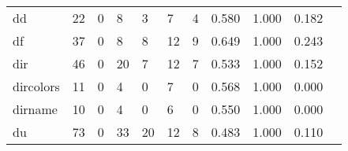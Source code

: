 \begin{longtable}{lp{1.20cm}p{1.20cm}p{1.20cm}p{1.20cm}p{1.20cm}p{1.20cm}p{1.20cm}p{1.20cm}p{1.20cm}p{1.20cm}}
dd        &                                    22 &                                                  0 &                                                  8 &                                                  3 &                                                  7 &                                                  4 &                                         0.580 &                                              1.000 &                                              0.182 \\
df        &                                    37 &                                                  0 &                                                  8 &                                                  8 &                                                 12 &                                                  9 &                                         0.649 &                                              1.000 &                                              0.243 \\
dir       &                                    46 &                                                  0 &                                                 20 &                                                  7 &                                                 12 &                                                  7 &                                         0.533 &                                              1.000 &                                              0.152 \\
dircolors &                                    11 &                                                  0 &                                                  4 &                                                  0 &                                                  7 &                                                  0 &                                         0.568 &                                              1.000 &                                              0.000 \\
dirname   &                                    10 &                                                  0 &                                                  4 &                                                  0 &                                                  6 &                                                  0 &                                         0.550 &                                              1.000 &                                              0.000 \\
du        &                                    73 &                                                  0 &                                                 33 &                                                 20 &                                                 12 &                                                  8 &                                         0.483 &                                              1.000 &                                              0.110 \\

\end{longtable}
